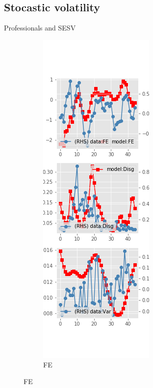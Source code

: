 \documentclass{beamer}
\begin{document}
\subsection{Stocastic volatility}

\begin{frame}{Professionals and SESV}
	\begin{figure}[ht]
		\label{SESV_diag_SPF}
		\begin{subfigure}[b]{0.2\textwidth}
			\centering
			\caption{FE}
			\includegraphics[width=\textwidth, height = 0.8\textheight]{figuresDraft/spf_se_est_sv_diag0.png}

\end{subfigure}
\end{figure}
\end{frame}
\end{document}
